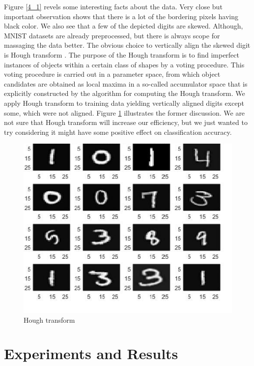 Figure \ref{4_1} revels some interesting facts about the data. Very close but important observation shows that there is a lot of the bordering pixels having black color. We also see that a few of the depicted digits are skewed. Although, MNIST datasets are already preprocessed, but there is always scope for massaging the data better. The obvious choice to vertically align the skewed digit is Hough transform \citep{Lean2008}. The purpose of the Hough transform is to find imperfect instances of objects within a certain class of shapes by a voting procedure. This voting procedure is carried out in a parameter space, from which object candidates are obtained as local maxima in a so-called accumulator space that is explicitly constructed by the algorithm for computing the Hough transform. We apply Hough transform to training data yielding vertically aligned digits except some, which were not aligned. Figure \ref{4_2} illustrates the former discussion. We are not sure that Hough transform will increase our efficiency, but we just wanted to try considering it might have some positive effect on classification accuracy.

\begin{figure}[h!]
\begin{center}
\includegraphics[width=\textwidth]{./Figures/4_2.png}
\caption {Hough transform}
\label{4_2} 
\end{center}
\end{figure}

\section{Experiments and Results}
\label{C4:ER}

